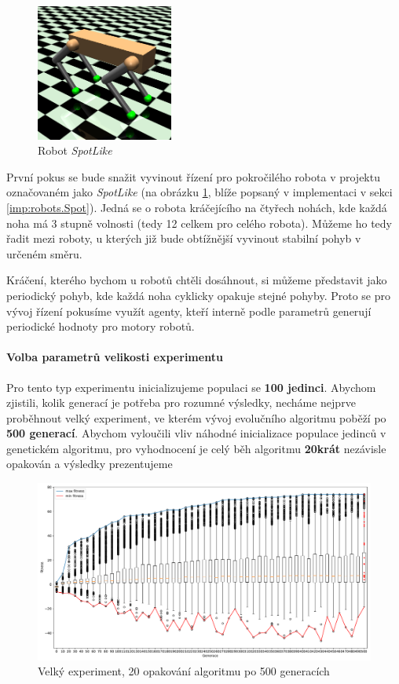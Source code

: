 \begin{figure}[!htb]
    \centering
    \includegraphics[width=0.4\textwidth]{../img/crop_SpotLike.jpg}
    \caption{Robot \emph{SpotLike}}
    \label{fig:robot:spotlike}
\end{figure}

První pokus se bude snažit vyvinout řízení pro pokročilého robota v projektu
označovaném jako \emph{SpotLike} (na obrázku \ref{fig:robot:spotlike}, blíže
popsaný v implementaci v sekci \ref{imp:robots.Spot}). Jedná se o robota
kráčejícího na čtyřech nohách, kde každá noha má 3 stupně volnosti (tedy 12
celkem pro celého robota). Můžeme ho tedy řadit mezi roboty, u kterých již bude
obtížnější vyvinout stabilní pohyb v určeném směru.

Kráčení, kterého bychom u robotů chtěli dosáhnout, si můžeme představit jako
periodický pohyb, kde každá noha cyklicky opakuje stejné pohyby. Proto se pro
vývoj řízení pokusíme využít agenty, kteří interně podle parametrů generují
periodické hodnoty pro motory robotů. 


\paragraph{Volba parametrů velikosti experimentu}
Pro tento typ experimentu inicializujeme populaci se \textbf{100 jedinci}.
Abychom zjistili, kolik generací je potřeba pro rozumné výsledky, necháme
nejprve proběhnout velký experiment, ve kterém vývoj evolučního algoritmu
poběží po \textbf{500 generací}. Abychom vyloučili vliv náhodné inicializace
populace jedinců v genetickém algoritmu, pro vyhodnocení je celý
běh algoritmu \textbf{20krát} nezávisle opakován a výsledky prezentujeme

\begin{figure}[!htb]
    \centering
    \includegraphics[width=1\textwidth]{../img/BIGexperiment1_TFS_10ticks.pdf}
    \caption{Velký experiment, 20 opakování algoritmu po 500 generacích}
    \label{fig:exp_big}
\end{figure}


